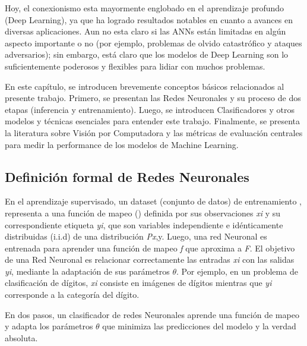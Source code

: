 Hoy, el conexionismo esta mayormente englobado en el aprendizaje profundo (Deep Learning), ya que ha logrado  resultados notables en cuanto a avances en diversas aplicaciones. Aun no esta claro si las ANNs están limitadas en algún aspecto importante o no (por ejemplo, problemas de olvido catastrófico y ataques adversarios); sin embargo, está claro que los modelos de Deep Learning son lo suficientemente poderosos y flexibles para lidiar con muchos problemas.

En este capítulo, se introducen brevemente conceptos básicos relacionados al presente trabajo. Primero, se presentan las Redes Neuronales y su proceso de dos etapas (inferencia y entrenamiento). Luego, se introducen Clasificadores y otros modelos y técnicas esenciales para entender este trabajo. Finalmente, se presenta la literatura sobre Visión por Computadora y las métricas de evaluación centrales para medir la performance de los modelos de Machine Learning.

\subsection{Definición formal de Redes Neuronales}
En el aprendizaje supervisado, un dataset (conjunto de datos) de entrenamiento , representa a una función de mapeo () definida por sus observaciones \textit{xi} y su correspondiente etiqueta \textit{yi}, que son variables independiente e idénticamente distribuidas (i.i.d) de una distribución \textit{Px},y. Luego, una red Neuronal es entrenada para aprender una función de mapeo \textit{f} que aproxima a \textit{F}. El objetivo de una Red Neuronal es relacionar correctamente las entradas \textit{xi} con las salidas \textit{yi}, mediante la adaptación de sus parámetros $\theta$. Por ejemplo, en un problema de clasificación de dígitos, \textit{xi} consiste en imágenes de dígitos mientras que \textit{yi} corresponde a la categoría del dígito.


En dos pasos, un clasificador de redes Neuronales aprende una función de mapeo  y adapta los parámetros $\theta$ que minimiza las predicciones del modelo y la verdad absoluta.

